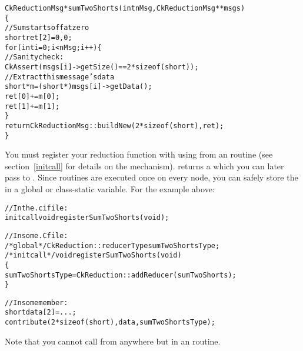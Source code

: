 \begin{alltt}
CkReductionMsg *sumTwoShorts(int nMsg,CkReductionMsg **msgs)
\{
  //Sum starts off at zero
  short ret[2]={0,0};
  for (int i=0;i<nMsg;i++) \{
    //Sanity check:
    CkAssert(msgs[i]->getSize()==2*sizeof(short));
    //Extract this message's data
    short *m=(short *)msgs[i]->getData();
    ret[0]+=m[0];
    ret[1]+=m[1];
  \}
  return CkReductionMsg::buildNew(2*sizeof(short),ret);
\}
\end{alltt}

You must register your reduction function with \charmpp{} 
using  from
an  routine (see section~\ref{initcall} for details
on the  mechanism).   
returns a  which you can later 
pass to .  Since  routines are executed
once on every node, you can safely store the 
in a global or class-static variable.  For the example above:

\begin{alltt}
//In the .ci file:
  initcall void registerSumTwoShorts(void);

//In some .C file:
/*global*/ CkReduction::reducerType sumTwoShortsType;
/*initcall*/ void registerSumTwoShorts(void)
\{
  sumTwoShortsType=CkReduction::addReducer(sumTwoShorts);
\}

//In some member:
  short data[2]=...;
  contribute(2*sizeof(short),data,sumTwoShortsType);
\end{alltt}

Note that you cannot call 
from anywhere but in an  routine.


